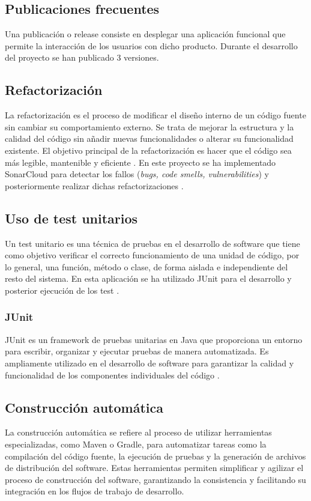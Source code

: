 \subsection{Publicaciones frecuentes}
Una publicación o release consiste en desplegar una aplicación funcional que permite la interacción de los usuarios con dicho producto. Durante el desarrollo del proyecto se han publicado 3 versiones.
\subsection{Refactorización}
La refactorización es el proceso de modificar el diseño interno de un código fuente sin cambiar su comportamiento externo. Se trata de mejorar la estructura y la calidad del código sin añadir nuevas funcionalidades o alterar su funcionalidad existente. El objetivo principal de la refactorización es hacer que el código sea más legible, mantenible y eficiente \cite{asse2015}. En este proyecto se ha implementado SonarCloud para detectar los fallos (\textit{bugs, code smells, vulnerabilities}) y posteriormente realizar dichas refactorizaciones .
\subsection{Uso de test unitarios}
Un test unitario es una técnica de pruebas en el desarrollo de software que tiene como objetivo verificar el correcto funcionamiento de una unidad de código, por lo general, una función, método o clase, de forma aislada e independiente del resto del sistema. En esta aplicación se ha utilizado JUnit para el desarrollo y posterior ejecución de los test \cite{8823472}.
\subsubsection{JUnit}
JUnit es un framework de pruebas unitarias en Java que proporciona un entorno para escribir, organizar y ejecutar pruebas de manera automatizada. Es ampliamente utilizado en el desarrollo de software para garantizar la calidad y funcionalidad de los componentes individuales del código \cite{8823472}.
\subsection{Construcción automática}
La construcción automática se refiere al proceso de utilizar herramientas especializadas, como Maven o Gradle, para automatizar tareas como la compilación del código fuente, la ejecución de pruebas y la generación de archivos de distribución del software. Estas herramientas permiten simplificar y agilizar el proceso de construcción del software, garantizando la consistencia y facilitando su integración en los flujos de trabajo de desarrollo.
